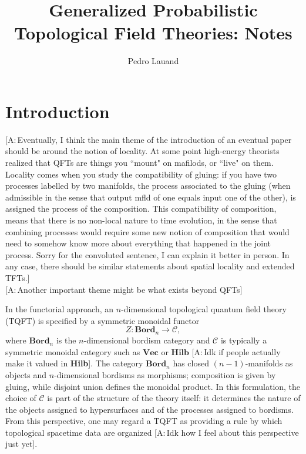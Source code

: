 \documentclass[prl,aps,10pt,superscriptaddress, floatfix]{revtex4-2}
\newcommand\al[1]{\textcolor{pansypurple}{ [A:\,#1]}}
\begin{document}
\title{Generalized Probabilistic Topological Field Theories: Notes}
\author{Pedro Lauand}

\maketitle
\section{Introduction}

\al{Eventually, I think the main theme of the introduction of an eventual paper should be around the notion of locality. At some point high-energy theorists realized that QFTs are things you ``mount" on mafilods, or ``live" on them. Locality comes when you study the compatibility of gluing: if you have two processes labelled by two manifolds, the process associated to the gluing (when admissible in the sense that output mfld of one equals input one of the other), is assigned the process of the composition. This compatibility of composition, means that there is no non-local nature to time evolution, in the sense that combining processes would require some new notion of composition that would need to somehow know more about everything that happened in the joint process. Sorry for the convoluted sentence, I can explain it better in person. In any case, there should be similar statements about spatial locality and extended TFTs.}
\\
\al{Another important theme might be what exists beyond QFTs}

In the functorial approach, an $n$-dimensional topological quantum field theory (TQFT) is specified by a symmetric monoidal functor
\[
Z: \mathbf{Bord}_n \rightarrow \mathcal{C},
\]
where $\mathbf{Bord}_n$ is the $n$-dimensional bordism category and $\mathcal{C}$ is typically a symmetric monoidal category such as $\mathbf{Vec}$ or $\mathbf{Hilb}$ \al{Idk if people actually make it valued in \textbf{Hilb}}. The category $\mathbf{Bord}_n$ has closed $(n-1)$-manifolds as objects and $n$-dimensional bordisms as morphisms; composition is given by gluing, while disjoint union defines the monoidal product. In this formulation, the choice of $\mathcal{C}$ is part of the structure of the theory itself: it determines the nature of the objects assigned to hypersurfaces and of the processes assigned to bordisms. From this perspective, one may regard a TQFT as providing a rule by which topological spacetime data are organized \al{Idk how I feel about this perspective just yet}.
\end{document}
